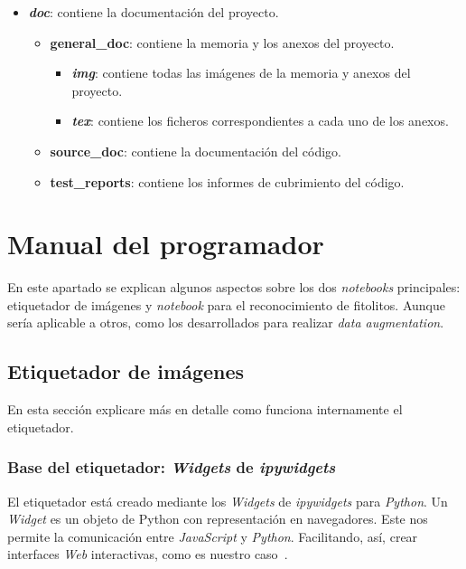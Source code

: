 \begin{itemize}
\begin{itemize}
\begin{itemize}
			\end{itemize}
		\item \textit{\textbf{doc}}: contiene la documentación del proyecto.
		\begin{itemize}
			\item \textbf{general\_doc}: contiene la memoria y los anexos del proyecto.
				\begin{itemize}
					\item \textit{\textbf{img}}: contiene todas las imágenes de la memoria y anexos del proyecto.
					\item \textit{\textbf{tex}}: contiene los ficheros correspondientes a cada uno de los anexos.
				\end{itemize}
			\item \textbf{source\_doc}: contiene la documentación del código.
			\item \textbf{test\_reports}: contiene los informes de cubrimiento del código.
		\end{itemize}
	\end{itemize}
\end{itemize}

\section{Manual del programador}

En este apartado se explican algunos aspectos sobre los dos \textit{notebooks} principales: etiquetador de imágenes y \textit{notebook} para el reconocimiento de fitolitos. Aunque sería aplicable a otros, como los desarrollados para realizar \textit{data augmentation}. 

\subsection{Etiquetador de imágenes}

En esta sección explicare más en detalle como funciona internamente el etiquetador.

\subsubsection{Base del etiquetador: \textit{Widgets} de \textit{ipywidgets}}

El etiquetador está creado mediante los \textit{Widgets} de \textit{ipywidgets} para \textit{Python}. Un \textit{Widget} es un objeto de Python con representación en navegadores. Este nos permite la comunicación entre \textit{JavaScript} y \textit{Python}. Facilitando, así, crear interfaces \textit{Web} interactivas, como es nuestro caso~\cite{ipywidgets:whataarewidgets}.

